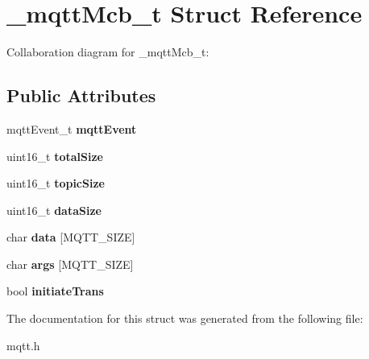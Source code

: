 \hypertarget{struct__mqttMcb__t}{}\section{\+\_\+mqtt\+Mcb\+\_\+t Struct Reference}
\label{struct__mqttMcb__t}


Collaboration diagram for \+\_\+mqtt\+Mcb\+\_\+t\+:
\subsection*{Public Attributes}
\begin{DoxyCompactItemize}
\item 
\mbox{\label{struct__mqttMcb__t_a2444e1da64e107ac3e38c67ca5c5bbed}} 
mqtt\+Event\+\_\+t {\bfseries mqtt\+Event}
\item 
\mbox{\label{struct__mqttMcb__t_a200ee8c05ebb39e64b7b66b7710dce0f}} 
uint16\+\_\+t {\bfseries total\+Size}
\item 
\mbox{\label{struct__mqttMcb__t_adb2a22865e9366348daa11bad69f3a1e}} 
uint16\+\_\+t {\bfseries topic\+Size}
\item 
\mbox{\label{struct__mqttMcb__t_ae44a8d1ad53b2786df67ab57179d50ae}} 
uint16\+\_\+t {\bfseries data\+Size}
\item 
\mbox{\label{struct__mqttMcb__t_a007841c0e069c54cc67965906022496a}} 
char {\bfseries data} \mbox{[}M\+Q\+T\+T\+\_\+\+S\+I\+ZE\mbox{]}
\item 
\mbox{\label{struct__mqttMcb__t_a26e0c1005309c7095d87a990914646c6}} 
char {\bfseries args} \mbox{[}M\+Q\+T\+T\+\_\+\+S\+I\+ZE\mbox{]}
\item 
\mbox{\label{struct__mqttMcb__t_aacc31f6cb888369dc2294e11898c3114}} 
bool {\bfseries initiate\+Trans}
\end{DoxyCompactItemize}


The documentation for this struct was generated from the following file\+:\begin{DoxyCompactItemize}
\item 
mqtt.\+h\end{DoxyCompactItemize}
